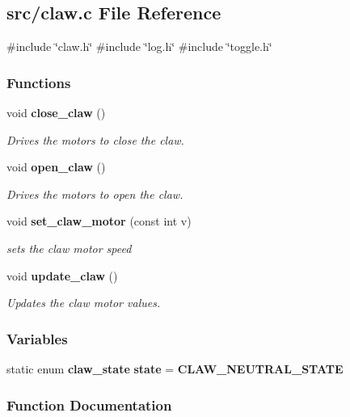 \subsection{src/claw.c File Reference}
\label{a00086}
{\ttfamily \#include \char`\"{}claw.\+h\char`\"{}}\newline
{\ttfamily \#include \char`\"{}log.\+h\char`\"{}}\newline
{\ttfamily \#include \char`\"{}toggle.\+h\char`\"{}}\newline
\subsubsection*{Functions}
\begin{DoxyCompactItemize}
\item 
void \textbf{ close\+\_\+claw} ()
\begin{DoxyCompactList}\small\item\em Drives the motors to close the claw. \end{DoxyCompactList}\item 
void \textbf{ open\+\_\+claw} ()
\begin{DoxyCompactList}\small\item\em Drives the motors to open the claw. \end{DoxyCompactList}\item 
void \textbf{ set\+\_\+claw\+\_\+motor} (const int v)
\begin{DoxyCompactList}\small\item\em sets the claw motor speed \end{DoxyCompactList}\item 
void \textbf{ update\+\_\+claw} ()
\begin{DoxyCompactList}\small\item\em Updates the claw motor values. \end{DoxyCompactList}\end{DoxyCompactItemize}
\subsubsection*{Variables}
\begin{DoxyCompactItemize}
\item 
static enum \textbf{ claw\+\_\+state} \textbf{ state} = \textbf{ C\+L\+A\+W\+\_\+\+N\+E\+U\+T\+R\+A\+L\+\_\+\+S\+T\+A\+TE}
\end{DoxyCompactItemize}


\subsubsection{Function Documentation}
\mbox{\label{a00086_ac42dd40dbb37219295286859c6b068c2}} 
